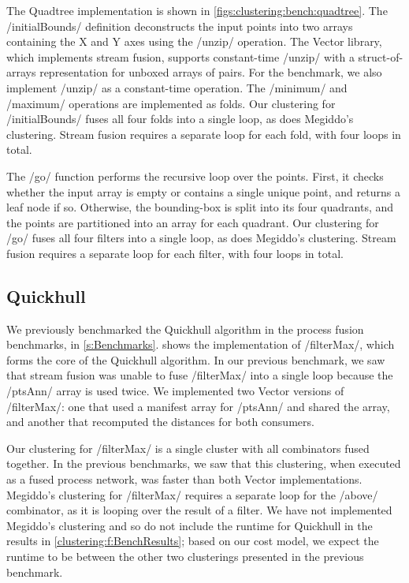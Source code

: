 The Quadtree implementation is shown in \cref{figs:clustering:bench:quadtree}.
The \Hs/initialBounds/ definition deconstructs the input points into two arrays containing the X and Y axes using the \Hs/unzip/ operation.
The Vector library, which implements stream fusion, supports constant-time \Hs/unzip/ with a struct-of-arrays representation for unboxed arrays of pairs.
For the benchmark, we also implement \Hs/unzip/ as a constant-time operation.
The \Hs/minimum/ and \Hs/maximum/ operations are implemented as folds.
Our clustering for \Hs/initialBounds/ fuses all four folds into a single loop, as does Megiddo's clustering.
Stream fusion requires a separate loop for each fold, with four loops in total.

The \Hs/go/ function performs the recursive loop over the points.
First, it checks whether the input array is empty or contains a single unique point, and returns a leaf node if so.
Otherwise, the bounding-box is split into its four quadrants, and the points are partitioned into an array for each quadrant.
Our clustering for \Hs/go/ fuses all four filters into a single loop, as does Megiddo's clustering.
Stream fusion requires a separate loop for each filter, with four loops in total.


\subsection{Quickhull}
We previously benchmarked the Quickhull algorithm in the process fusion benchmarks, in \cref{s:Benchmarks}.
 shows the implementation of \Hs/filterMax/, which forms the core of the Quickhull algorithm.
In our previous benchmark, we saw that stream fusion was unable to fuse \Hs/filterMax/ into a single loop because the \Hs/ptsAnn/ array is used twice.
We implemented two Vector versions of \Hs/filterMax/: one that used a manifest array for \Hs/ptsAnn/ and shared the array, and another that recomputed the distances for both consumers.

Our clustering for \Hs/filterMax/ is a single cluster with all combinators fused together.
In the previous benchmarks, we saw that this clustering, when executed as a fused process network, was faster than both Vector implementations.
Megiddo's clustering for \Hs/filterMax/ requires a separate loop for the \Hs/above/ combinator, as it is looping over the result of a filter.
We have not implemented Megiddo's clustering and so do not include the runtime for Quickhull in the results in \cref{clustering:f:BenchResults}; based on our cost model, we expect the runtime to be between the other two clusterings presented in the previous benchmark.



